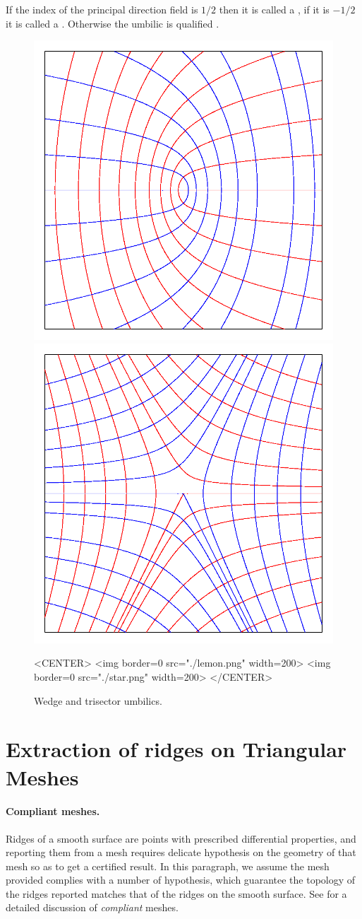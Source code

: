 If the index of the principal direction field is $1/2$
then it is called a
, if it is $-1/2$ it is called a .
 Otherwise the umbilic is qualified
.


\begin{figure}[!ht]
\begin{ccTexOnly}
\centerline{
\includegraphics[width=.3\linewidth]{Ridges_3/lemon}
\includegraphics[width=.3\linewidth]{Ridges_3/star}}
\end{ccTexOnly}
\caption{Wedge and trisector umbilics.}
\label{umbilics}
\begin{ccHtmlOnly}
<CENTER> <img border=0 src="./lemon.png" width=200>
 <img border=0 src="./star.png" width=200>
</CENTER>
\end{ccHtmlOnly}
\end{figure}



\section{Extraction of ridges on Triangular Meshes}
\label{ridge-mesh}


\paragraph{Compliant meshes.}
Ridges of a smooth surface are points with prescribed differential
properties, and reporting them from a mesh requires delicate
hypothesis on the geometry of that mesh so as to get a certified
result. In this paragraph, we assume the mesh provided complies with a
number of hypothesis, which guarantee the topology of the ridges
reported matches that of the ridges on the smooth surface. See
\cite{cgal:cp-tdare-05} for a detailed discussion of {\em compliant} meshes.
\medskip

